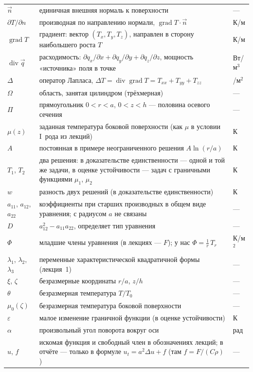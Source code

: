 \documentclass[a4paper,12pt]{article}
\DeclareMathOperator{\Div}{div}
\DeclareMathOperator{\Grad}{grad}
\begin{document}
\begin{longtable}{@{}>{\raggedright\arraybackslash}p{2.6cm}>{\raggedright\arraybackslash}p{9.6cm}>{\raggedright\arraybackslash}p{3.6cm}@{}}
$\vec n$ & единичная внешняя нормаль к поверхности & — \\
$\partial T/\partial n$ & производная по направлению нормали, $\Grad T\cdot\vec n$ & К/м \\
$\Grad T$ & градиент: вектор $(T_x,T_y,T_z)$, направлен в сторону наибольшего роста $T$ & К/м \\
$\Div\vec q$ & расходимость: $\partial q_x/\partial x+\partial q_y/\partial y+\partial q_z/\partial z$, мощность «источника» поля в точке & Вт/м$^3$ \\
$\Delta$ & оператор Лапласа, $\Delta T=\Div\Grad T=T_{xx}+T_{yy}+T_{zz}$ & 1/м$^2$ \\
$\Omega$ & область, занятая цилиндром (трёхмерная) & — \\
$\Pi$ & прямоугольник $0<r<a$, $0<z<h$ — половина осевого сечения & — \\
$\mu(z)$ & заданная температура боковой поверхности (как $\mu$ в условии I~рода из лекций) & К \\
$A$ & постоянная в примере неограниченного решения $A\ln(r/a)$ & К \\
$T_1$, $T_2$ & два решения: в доказательстве единственности — одной и той же задачи, в оценке устойчивости — задач с граничными функциями $\mu_1$, $\mu_2$ & К \\
$w$ & разность двух решений (в доказательстве единственности) & К \\
$a_{11}$, $a_{12}$, $a_{22}$ & коэффициенты при старших производных в общем виде уравнения; с радиусом $a$ не связаны & — \\
$D$ & $a_{12}^2-a_{11}a_{22}$, определяет тип уравнения & — \\
$\Phi$ & младшие члены уравнения (в лекциях — $F$); у нас $\Phi=\frac1r\,T_r$ & К/м$^2$ \\
$\lambda_1$, $\lambda_2$, $\lambda_3$ & переменные характеристической квадратичной формы (лекция~1) & — \\
$\xi$, $\zeta$ & безразмерные координаты $r/a$, $z/h$ & — \\
$\theta$ & безразмерная температура $T/T_0$ & — \\
$\mu_0(\zeta)$ & безразмерная температура боковой поверхности & — \\
$\varepsilon$ & малое изменение граничной функции (в оценке устойчивости) & К \\
$\alpha$ & произвольный угол поворота вокруг оси & рад \\
$u$, $f$ & искомая функция и свободный член в обозначениях лекций; в отчёте — только в формуле $u_t=a^2\Delta u+f$ (там $f=F/(C\rho)$) & — \\
\bottomrule
\end{longtable}
\end{document}
